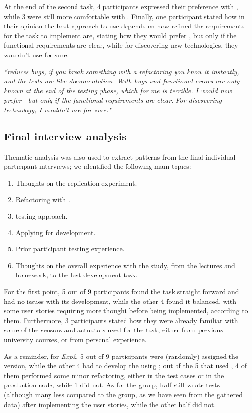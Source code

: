 At the end of the second task, 4 participants expressed their preference with \tdd, while 3 were still more comfortable with \notdd. Finally, one participant stated how in their opinion the best approach to use depends on how refined the requirements for the task to implement are, stating how they would prefer \tdd, but only if the functional requirements are clear, while for discovering new technologies, they wouldn't use \tdd for sure:
\begin{mdframed}
    \textit{``\tdd reduces bugs, if you break something with a refactoring you know it instantly, and the tests are like documentation. With \notdd bugs and functional errors are only known at the end of the testing phase, which for me is terrible. I would now prefer \tdd, but only if the functional requirements are clear. For discovering technology, I wouldn't use \tdd for sure."}
\end{mdframed}



\subsection{Final interview analysis}
Thematic analysis was also used to extract patterns from the final individual participant interviews; we identified the following main topics: 
\begin{enumerate}
    \item Thoughts on the replication experiment.
    \item Refactoring with \tdd.
    \item \notdd testing approach.
    \item Applying \tdd for \ess development.
    \item Prior participant testing experience.
    \item Thoughts on the overall experience with the study, from the lectures and homework, to the last development task.
\end{enumerate}

For the first point, 5 out of 9 participants found the task straight forward and had no issues with its development, while the other 4 found it balanced, with some user stories requiring more thought before being implemented, according to them. Furthermore, 3 participants stated how they were already familiar with some of the sensors and actuators used for the task, either from previous university courses, or from personal experience.

As a reminder, for \textit{Exp2}, 5 out of 9 participants were (randomly) assigned the \tdd version, while the other 4 had to develop the \es using \notdd; out of the 5 that used \tdd, 4 of them performed some minor refactoring, either in the test cases or in the production code, while 1 did not.
As for the \notdd group, half still wrote tests (although many less compared to the \tdd group, as we have seen from the gathered data) after implementing the user stories, while the other half did not.

